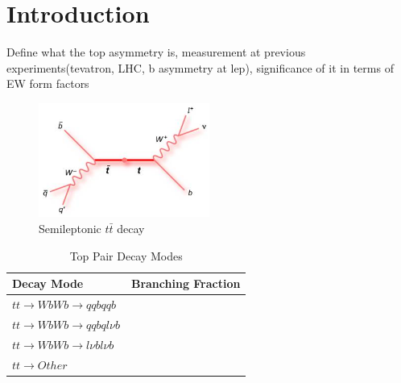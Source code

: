 \section{Introduction}
Define what the top asymmetry is, measurement at previous experiments(tevatron, LHC, b asymmetry at lep), significance of it in terms of EW form factors


\begin{figure}
  \centering
  \includegraphics[width=0.5\textwidth]{TopAnalysis/figures/TopFeynmann.jpg}
  \caption[Semileptonic $t\bar{t}$ decay]{Semileptonic $t\bar{t}$ decay}
  \label{fig:topfeynmann}
\end{figure}

\begin{table}
  \centering
  \begin{tabular}{l |p{120mm}}
    \toprule
    Decay Mode     & Branching Fraction  \\
    \midrule
    $tt\rightarrow WbWb\rightarrow qqbqqb$ & \\
    \midrule
    $tt\rightarrow WbWb\rightarrow qqbql\nu b$ & \\
    \midrule
    $tt\rightarrow WbWb\rightarrow l\nu bl\nu b$ & \\
    \midrule
    $tt\rightarrow Other$ & \\
    \bottomrule
  \end{tabular}
  \caption{Top Pair Decay Modes}
  \label{table:topdecaymodes}
\end{table}


